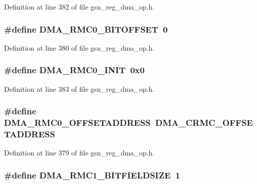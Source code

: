 Definition at line 382 of file gsn\_\-reg\_\-dma\_\-op.h.

\hypertarget{a00547_a4d7f484b0f74d9099476be859120c47a}{
\subsubsection[{DMA\_\-RMC0\_\-BITOFFSET}]{\setlength{\rightskip}{0pt plus 5cm}\#define DMA\_\-RMC0\_\-BITOFFSET~0}}
\label{a00547_a4d7f484b0f74d9099476be859120c47a}


Definition at line 380 of file gsn\_\-reg\_\-dma\_\-op.h.

\hypertarget{a00547_aae6295b5f54ed72955ea189017408db7}{
\subsubsection[{DMA\_\-RMC0\_\-INIT}]{\setlength{\rightskip}{0pt plus 5cm}\#define DMA\_\-RMC0\_\-INIT~0x0}}
\label{a00547_aae6295b5f54ed72955ea189017408db7}


Definition at line 383 of file gsn\_\-reg\_\-dma\_\-op.h.

\hypertarget{a00547_adbc08a82326f5ff788b0f0b5ecc549c2}{
\subsubsection[{DMA\_\-RMC0\_\-OFFSETADDRESS}]{\setlength{\rightskip}{0pt plus 5cm}\#define DMA\_\-RMC0\_\-OFFSETADDRESS~DMA\_\-CRMC\_\-OFFSETADDRESS}}
\label{a00547_adbc08a82326f5ff788b0f0b5ecc549c2}


Definition at line 379 of file gsn\_\-reg\_\-dma\_\-op.h.

\hypertarget{a00547_aca19d261f11d5272f20a429386f1e46f}{
\subsubsection[{DMA\_\-RMC1\_\-BITFIELDSIZE}]{\setlength{\rightskip}{0pt plus 5cm}\#define DMA\_\-RMC1\_\-BITFIELDSIZE~1}}
\label{a00547_aca19d261f11d5272f20a429386f1e46f}



